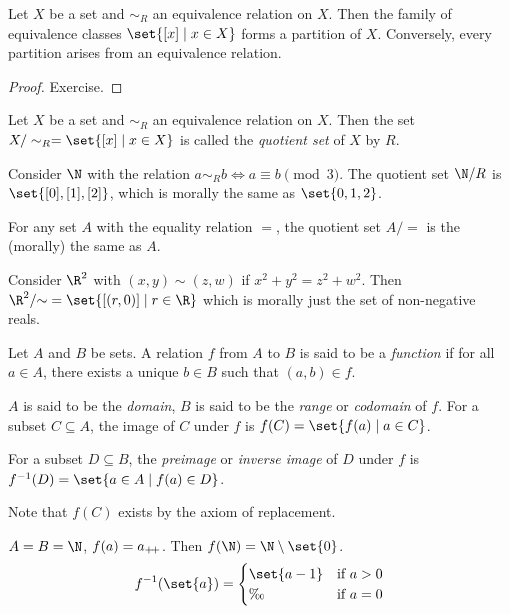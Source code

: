 \begin{proposition} \label{thm:fter}
    Let $X$ be a set and $\sim_R$ an equivalence relation on $X$.
    Then the family of equivalence classes $\set{[x] \mid x \in X}$ forms
    a partition of $X$.
    Conversely, every partition arises from an equivalence relation.
\end{proposition}
\begin{proof}
    Exercise.
\end{proof}

\begin{definition}
    Let $X$ be a set and $\sim_R$ an equivalence relation on $X$.
    Then the set $X / \sim_R = \set{[x] \mid x \in X}$ is called the
    \emph{quotient set} of $X$ by $R$.
\end{definition}
\begin{examples}
    \item Consider $\N$ with the relation $a \sim_R b \iff a \equiv b \pmod{3}$.
    The quotient set $\N / R$ is $\set{[0], [1], [2]}$, which is morally the
    same as $\set{0, 1, 2}$.
    \item For any set $A$ with the equality relation $=$, the quotient set
    $A /{=}$ is the (morally) the same as $A$.
    \item Consider $\R^2$ with $(x, y) \sim (z, w)$ if $x^2 + y^2 = z^2 + w^2$.
    Then $\R^2 /{\sim} = \set{[(r, 0)] \mid r \in \R}$ which is morally just
    the set of non-negative reals.
\end{examples}

\begin{definition}[Function] \label{def:fn}
    Let $A$ and $B$ be sets.
    A relation $f$ from $A$ to $B$ is said to be a \emph{function} if for
    all $a \in A$, there exists a unique $b \in B$ such that $(a, b) \in f$.

    $A$ is said to be the \emph{domain}, $B$ is said to be the \emph{range}
    or \emph{codomain} of $f$.
    For a subset $C \subseteq A$, the image of $C$ under $f$ is
    $f(C) = \set{f(a) \mid a \in C}$.

    For a subset $D \subseteq B$, the \emph{preimage} or \emph{inverse image} of
    $D$ under $f$ is $f^{-1}(D) = \set{a \in A \mid f(a) \in D}$.
\end{definition}
Note that $f(C)$ exists by the axiom of replacement.
\begin{examples}
    \item $A = B = \N$, $f(a) = a_{+\!+}$.
    Then $f(\N) = \N \setminus \set{0}$. \[
        f^{-1}(\set{a}) = \begin{cases}
            \set{a - 1} & \text{if } a > 0 \\
            \O & \text{if } a = 0
        \end{cases}
    \]
\end{examples}

